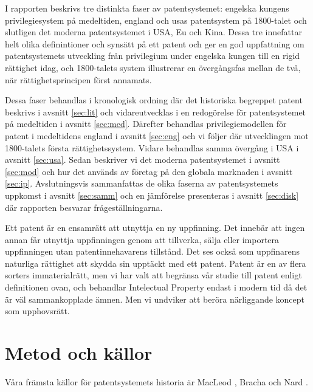 I rapporten beskrivs tre distinkta faser av patentsystemet: engelska kungens privilegiesystem på medeltiden, england och usas patentsystem på 1800-talet och slutligen det moderna patentsystemet i USA, Eu och Kina. Dessa tre innefattar helt olika definintioner och synsätt på ett patent och ger en god uppfattning om patentsystemets utveckling från privilegium under engelska kungen till en rigid rättighet idag, och 1800-talets system illustrerar en övergångsfas mellan de två, när rättighetsprincipen först annamats. 

Dessa faser behandlas i kronologisk ordning där det historiska begreppet patent beskrivs i avsnitt \ref{sec:lit} och vidareutvecklas i en redogörelse för patentsystemet på medeltiden i avsnitt \ref{sec:med}. Därefter behandlas privilegiemodellen för patent i medeltidens england i avsnitt \ref{sec:eng} och vi följer där utvecklingen mot 1800-talets första rättighetssystem. Vidare behandlas samma övergång i USA i avsnitt \ref{sec:usa}. Sedan beskriver vi det moderna patentsystemet i avsnitt \ref{sec:mod} och hur det används av företag på den globala marknaden i avsnitt \ref{sec:ip}. Avslutningsvis sammanfattas de olika faserna av patentsystemets uppkomst i avsnitt \ref{sec:samm} och en jämförelse presenteras i avsnitt \ref{sec:disk} där rapporten besvarar frågeställningarna.
 
 
 Ett patent är en ensamrätt att utnyttja en ny uppfinning. Det innebär att ingen
 annan får utnyttja uppfinningen genom att tillverka, sälja eller importera 
 uppfinningen utan patentinnehavarens tillstånd. Det ses också som uppfinarens naturliga rättighet att skydda sin upptäckt med ett patent. Patent är en av flera sorters
 immaterialrätt, men vi har valt att begränsa vår studie till patent enligt
 definitionen ovan, och behandlar Intelectual Property endast i modern tid då det är väl sammankopplade ämnen. Men vi undviker att beröra närliggande koncept som upphovsrätt.

\section{Metod och källor}

Våra främsta källor för patentsystemets historia är MacLeod \cite{macleod},
Bracha \cite{bracha} och Nard \cite{nard}.

